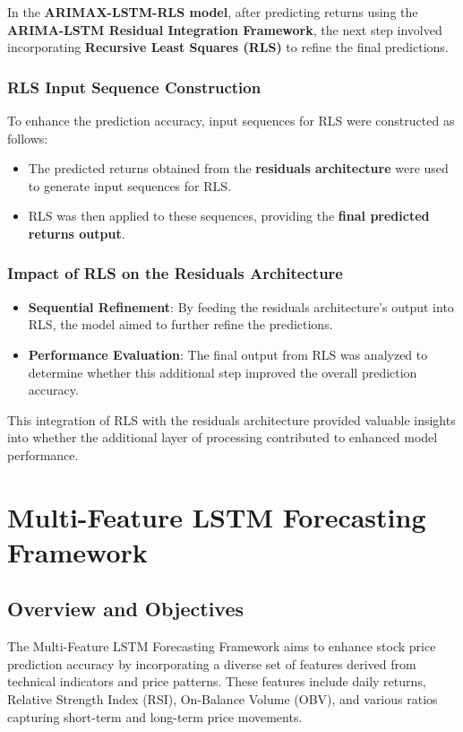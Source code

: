 In the \textbf{ARIMAX-LSTM-RLS model}, after predicting returns using the \textbf{ARIMA-LSTM Residual Integration Framework}, the next step involved incorporating \textbf{Recursive Least Squares (RLS)} to refine the final predictions.

\subsubsection{RLS Input Sequence Construction}

To enhance the prediction accuracy, input sequences for RLS were constructed as follows:
\begin{itemize}
    \item The predicted returns obtained from the \textbf{residuals architecture} were used to generate input sequences for RLS.
    \item RLS was then applied to these sequences, providing the \textbf{final predicted returns output}.
\end{itemize}

\subsubsection{Impact of RLS on the Residuals Architecture}

\begin{itemize}
    \item \textbf{Sequential Refinement}: By feeding the residuals architecture's output into RLS, the model aimed to further refine the predictions.
    \item \textbf{Performance Evaluation}: The final output from RLS was analyzed to determine whether this additional step improved the overall prediction accuracy.
\end{itemize}

This integration of RLS with the residuals architecture provided valuable insights into whether the additional layer of processing contributed to enhanced model performance.

\section{Multi-Feature LSTM Forecasting Framework}
\subsection{Overview and Objectives}
The Multi-Feature LSTM Forecasting Framework aims to enhance stock price prediction accuracy by incorporating a diverse set of features derived from technical indicators and price patterns. These features include daily returns, Relative Strength Index (RSI), On-Balance Volume (OBV), and various ratios capturing short-term and long-term price movements. 

